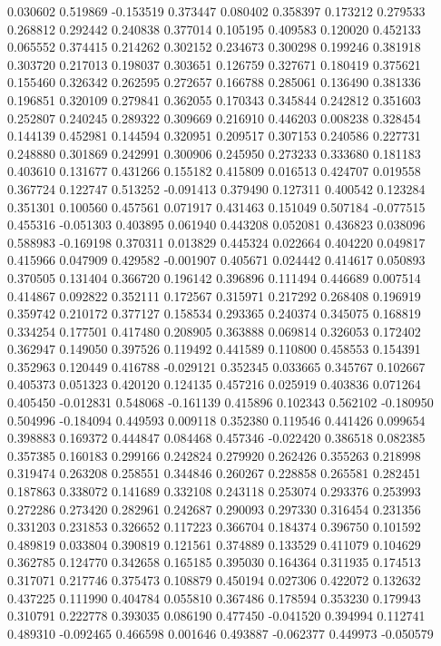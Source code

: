 0.030602
0.519869
-0.153519
0.373447
0.080402
0.358397
0.173212
0.279533
0.268812
0.292442
0.240838
0.377014
0.105195
0.409583
0.120020
0.452133
0.065552
0.374415
0.214262
0.302152
0.234673
0.300298
0.199246
0.381918
0.303720
0.217013
0.198037
0.303651
0.126759
0.327671
0.180419
0.375621
0.155460
0.326342
0.262595
0.272657
0.166788
0.285061
0.136490
0.381336
0.196851
0.320109
0.279841
0.362055
0.170343
0.345844
0.242812
0.351603
0.252807
0.240245
0.289322
0.309669
0.216910
0.446203
0.008238
0.328454
0.144139
0.452981
0.144594
0.320951
0.209517
0.307153
0.240586
0.227731
0.248880
0.301869
0.242991
0.300906
0.245950
0.273233
0.333680
0.181183
0.403610
0.131677
0.431266
0.155182
0.415809
0.016513
0.424707
0.019558
0.367724
0.122747
0.513252
-0.091413
0.379490
0.127311
0.400542
0.123284
0.351301
0.100560
0.457561
0.071917
0.431463
0.151049
0.507184
-0.077515
0.455316
-0.051303
0.403895
0.061940
0.443208
0.052081
0.436823
0.038096
0.588983
-0.169198
0.370311
0.013829
0.445324
0.022664
0.404220
0.049817
0.415966
0.047909
0.429582
-0.001907
0.405671
0.024442
0.414617
0.050893
0.370505
0.131404
0.366720
0.196142
0.396896
0.111494
0.446689
0.007514
0.414867
0.092822
0.352111
0.172567
0.315971
0.217292
0.268408
0.196919
0.359742
0.210172
0.377127
0.158534
0.293365
0.240374
0.345075
0.168819
0.334254
0.177501
0.417480
0.208905
0.363888
0.069814
0.326053
0.172402
0.362947
0.149050
0.397526
0.119492
0.441589
0.110800
0.458553
0.154391
0.352963
0.120449
0.416788
-0.029121
0.352345
0.033665
0.345767
0.102667
0.405373
0.051323
0.420120
0.124135
0.457216
0.025919
0.403836
0.071264
0.405450
-0.012831
0.548068
-0.161139
0.415896
0.102343
0.562102
-0.180950
0.504996
-0.184094
0.449593
0.009118
0.352380
0.119546
0.441426
0.099654
0.398883
0.169372
0.444847
0.084468
0.457346
-0.022420
0.386518
0.082385
0.357385
0.160183
0.299166
0.242824
0.279920
0.262426
0.355263
0.218998
0.319474
0.263208
0.258551
0.344846
0.260267
0.228858
0.265581
0.282451
0.187863
0.338072
0.141689
0.332108
0.243118
0.253074
0.293376
0.253993
0.272286
0.273420
0.282961
0.242687
0.290093
0.297330
0.316454
0.231356
0.331203
0.231853
0.326652
0.117223
0.366704
0.184374
0.396750
0.101592
0.489819
0.033804
0.390819
0.121561
0.374889
0.133529
0.411079
0.104629
0.362785
0.124770
0.342658
0.165185
0.395030
0.164364
0.311935
0.174513
0.317071
0.217746
0.375473
0.108879
0.450194
0.027306
0.422072
0.132632
0.437225
0.111990
0.404784
0.055810
0.367486
0.178594
0.353230
0.179943
0.310791
0.222778
0.393035
0.086190
0.477450
-0.041520
0.394994
0.112741
0.489310
-0.092465
0.466598
0.001646
0.493887
-0.062377
0.449973
-0.050579
